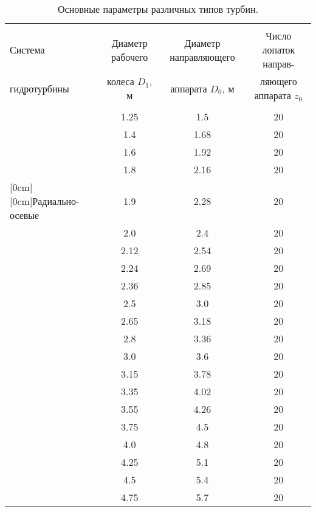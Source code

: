 \begin{table}[ht]
\caption{Основные параметры различных типов турбин.}
\label{tab_5}
\centering

\footnotesize

\begin{tabular}{|l|c|c|c|}

\hline
 
   & & & \\
 Система  & Диаметр рабочего  & Диаметр направляющего   & Число лопаток направ-\\
 гидротурбины & колеса $D_1$, м & аппарата $D_0$, м & ляющего аппарата $z_0$ \\
   & & & \\

\hline
    & 1.25 & 1.5 & 20\\
\cline{2-4}
    & 1.4 & 1.68 & 20\\
\cline{2-4}
    & 1.6 & 1.92 & 20\\
\cline{2-4}
    & 1.8 & 2.16 & 20\\
\cline{2-4}
\raisebox{5.5ex}[0cm][0cm]{Радиально-осевые} & 1.9 & 2.28 & 20  \\

\hline
\hline

    & 2.0 & 2.4 & 20\\
\cline{2-4}
    & 2.12 & 2.54 & 20\\
\cline{2-4}
    & 2.24 & 2.69 & 20\\
\cline{2-4}
    & 2.36 & 2.85 & 20\\
\cline{2-4}

    & 2.5 & 3.0 & 20\\
\cline{2-4}
    & 2.65 & 3.18 & 20\\
\cline{2-4}
    & 2.8 & 3.36 & 20\\
\cline{2-4}
    & 3.0 & 3.6 & 20\\
\cline{2-4}

    & 3.15 & 3.78 & 20\\
\cline{2-4}
    & 3.35 & 4.02 & 20\\
\cline{2-4}
    & 3.55 & 4.26 & 20\\
\cline{2-4}
    & 3.75 & 4.5 & 20\\
\cline{2-4}

    & 4.0 & 4.8 & 20\\
\cline{2-4}
    & 4.25 & 5.1 & 20\\
\cline{2-4}
    & 4.5 & 5.4 & 20\\
\cline{2-4}
    & 4.75 & 5.7 & 20\\
\cline{2-4}



\end{tabular}
\end{table}
